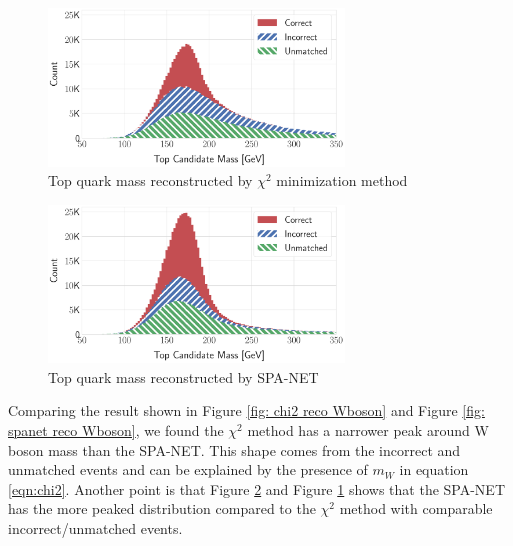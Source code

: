 \begin{figure}[H]
	\centering
	\includegraphics[width=0.7\textwidth]{Figures/network_t_quark_stacked_chi2.pdf}
	\caption{ Top quark mass reconstructed by $\chi^{2}$ minimization method}
	\label{fig: chi2 reco t quark}
\end{figure}
\begin{figure}[H]
	\centering
	\includegraphics[width=0.7\textwidth]{Figures/network_t_quark_stacked.pdf}
	\caption{ Top quark mass reconstructed by SPA-NET}
	\label{fig: spanet reco t quark}
\end{figure}
Comparing the result shown in Figure \ref{fig: chi2 reco Wboson} and Figure \ref{fig: spanet reco Wboson}, we found the $\chi^{2}$ method has a narrower peak around W boson mass than the SPA-NET. This shape comes from the incorrect and unmatched events and can be explained by the presence of $m_{W}$ in equation \ref{eqn:chi2}. Another point is that Figure \ref{fig: spanet reco t quark} and Figure \ref{fig: chi2 reco t quark} shows that the SPA-NET has the more peaked distribution compared to the $\chi^{2}$ method with comparable incorrect/unmatched events.

